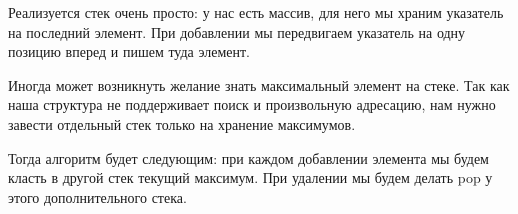 \documentclass[../main.tex]{subfiles}
\begin{document}
	Реализуется стек очень просто: у нас есть массив, для него мы храним указатель на последний элемент. При добавлении мы передвигаем указатель на одну позицию вперед и пишем туда элемент.
	
	Иногда может возникнуть желание знать максимальный элемент на стеке. Так как наша структура не поддерживает поиск и произвольную адресацию, нам нужно завести отдельный стек только на хранение максимумов. 
	
	Тогда алгоритм будет следующим: при каждом добавлении элемента мы будем класть в другой стек текущий максимум. При удалении мы будем делать pop у этого дополнительного стека.
	
	
\end{document}
